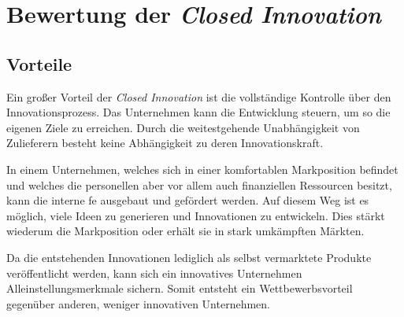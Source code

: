 \section{Bewertung der \textit{Closed Innovation}}\label{sec:bewertung}


\subsection{Vorteile}\label{sec:bewertung-vor}
Ein großer Vorteil der \textit{Closed Innovation} ist die vollständige Kontrolle über den Innovationsprozess.
Das Unternehmen kann die Entwicklung steuern,
um so die eigenen Ziele zu erreichen.
Durch die weitestgehende Unabhängigkeit von Zulieferern besteht keine Abhängigkeit zu deren Innovationskraft.

In einem Unternehmen, welches sich in einer komfortablen Markposition befindet
und welches die personellen aber vor allem auch finanziellen Ressourcen besitzt,
kann die interne \ac{fe} ausgebaut und gefördert werden.
Auf diesem Weg ist es möglich, viele Ideen zu generieren und Innovationen zu entwickeln.
Dies stärkt wiederum die Markposition oder erhält sie in stark umkämpften Märkten.

Da die entstehenden Innovationen lediglich als selbst vermarktete Produkte veröffentlicht werden,
kann sich ein innovatives Unternehmen Alleinstellungsmerkmale sichern.
Somit entsteht ein Wettbewerbsvorteil gegenüber anderen,
weniger innovativen Unternehmen.

